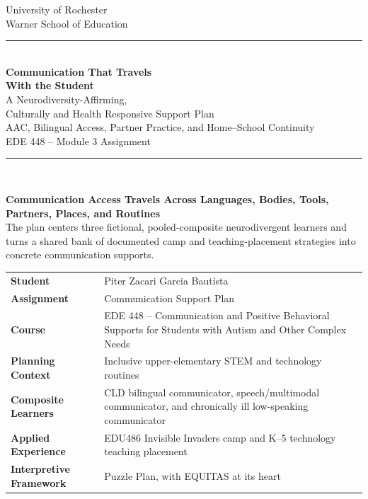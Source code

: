 \documentclass[11pt]{article}
\begin{document}
\hypersetup{pageanchor=false}
\begin{titlepage}
\thispagestyle{empty}

\begin{center}
{\large University of Rochester\\}
{\normalsize Warner School of Education\\[0.15in]}

{\color{PrimaryRed}\rule{\textwidth}{1.4pt}}\\[0.12in]
{\Huge\bfseries Communication That Travels\\[0.07in]
With the Student}\\[0.15in]
{\huge A Neurodiversity-Affirming,\\[0.06in]
Culturally and Health Responsive Support Plan}\\[0.12in]
{\Large AAC, Bilingual Access, Partner Practice, and Home--School Continuity}\\[0.14in]
{\large EDE 448 -- Module 3 Assignment}\\[0.10in]

\vfill

{\color{PrimaryRed}\rule{0.78\textwidth}{0.7pt}}\\[0.18in]

\colorbox{SoftBlue}{%
\parbox{0.95\textwidth}{%
\centering\small\vspace{0.02in}
\textbf{Communication Access Travels Across Languages, Bodies, Tools, Partners, Places, and Routines}\\[0.04in]
The plan centers three fictional, pooled-composite neurodivergent learners and turns a shared bank of documented camp and teaching-placement strategies into concrete communication supports.
}%
}
\end{center}

\vfill

\begin{center}
\renewcommand{\arraystretch}{1.18}
\setlength{\tabcolsep}{4pt}
\begin{tabular}{>{\bfseries\RaggedLeft\arraybackslash}p{1.85in} >{\RaggedRight\arraybackslash}p{5.0in}}
Student & Piter Zacari Garcia Bautista \\
Assignment & Communication Support Plan \\
Course & EDE 448 -- Communication and Positive Behavioral Supports for Students with Autism and Other Complex Needs \\
Planning Context & Inclusive upper-elementary STEM and technology routines \\
Composite Learners & CLD bilingual communicator, speech/multimodal communicator, and chronically ill low-speaking communicator \\
Applied Experience & EDU486 Invisible Invaders camp and K--5 technology teaching placement \\
Interpretive Framework & Puzzle Plan, with EQUITAS at its heart \\
\end{tabular}
\end{center}


\end{titlepage}
\end{document}
